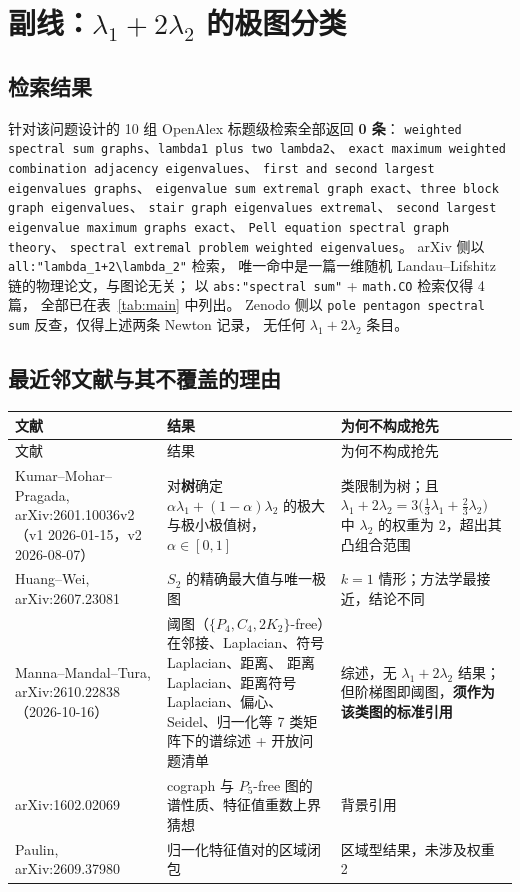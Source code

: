 \documentclass[UTF8,11pt]{ctexart}
\begin{document}
\section{副线：$\lambda_1+2\lambda_2$ 的极图分类}

\subsection{检索结果}

针对该问题设计的 10 组 OpenAlex 标题级检索全部返回 \textbf{0 条}：
\texttt{weighted spectral sum graphs}、\texttt{lambda1 plus two lambda2}、
\texttt{exact maximum weighted combination adjacency eigenvalues}、
\texttt{first and second largest eigenvalues graphs}、
\texttt{eigenvalue sum extremal graph exact}、\texttt{three block graph eigenvalues}、
\texttt{stair graph eigenvalues extremal}、
\texttt{second largest eigenvalue maximum graphs exact}、
\texttt{Pell equation spectral graph theory}、
\texttt{spectral extremal problem weighted eigenvalues}。
arXiv 侧以 \texttt{all:"lambda\_1+2\textbackslash lambda\_2"} 检索，
唯一命中是一篇一维随机 Landau--Lifshitz 链的物理论文，与图论无关；
以 \texttt{abs:"spectral sum"} + \texttt{math.CO} 检索仅得 4 篇，
全部已在表~\ref{tab:main} 中列出。
Zenodo 侧以 \texttt{pole pentagon spectral sum} 反查，仅得上述两条 Newton 记录，
无任何 $\lambda_1+2\lambda_2$ 条目。

\subsection{最近邻文献与其不覆盖的理由}

\begin{center}\small
\begin{longtable}{@{}p{4.4cm}p{5.4cm}p{5.0cm}@{}}
\toprule
文献 & 结果 & 为何不构成抢先\\
\midrule
\endfirsthead
\toprule
文献 & 结果 & 为何不构成抢先\\
\midrule
\endhead
Kumar--Mohar--Pragada, arXiv:2601.10036v2（v1 2026-01-15，v2 2026-08-07） &
对\textbf{树}确定 $\alpha\lambda_1+(1-\alpha)\lambda_2$ 的极大与极小极值树，
$\alpha\in[0,1]$ &
类限制为树；且 $\lambda_1+2\lambda_2=3\bigl(\tfrac13\lambda_1+\tfrac23\lambda_2\bigr)$
中 $\lambda_2$ 的权重为 2，超出其凸组合范围\\
Huang--Wei, arXiv:2607.23081 &
$S_2$ 的精确最大值与唯一极图 & $k=1$ 情形；方法学最接近，结论不同\\
Manna--Mandal--Tura, arXiv:2610.22838（2026-10-16） &
阈图（$\{P_4,C_4,2K_2\}$-free）在邻接、Laplacian、符号 Laplacian、距离、
距离 Laplacian、距离符号 Laplacian、偏心、Seidel、归一化等 7 类矩阵下的谱综述
+ 开放问题清单 &
综述，无 $\lambda_1+2\lambda_2$ 结果；但阶梯图即阈图，\textbf{须作为该类图的标准引用}\\
arXiv:1602.02069 & cograph 与 $P_5$-free 图的谱性质、特征值重数上界猜想 &
背景引用\\
Paulin, arXiv:2609.37980 & 归一化特征值对的区域闭包 & 区域型结果，未涉及权重 2\\
\bottomrule
\end{longtable}
\end{center}
\end{document}
